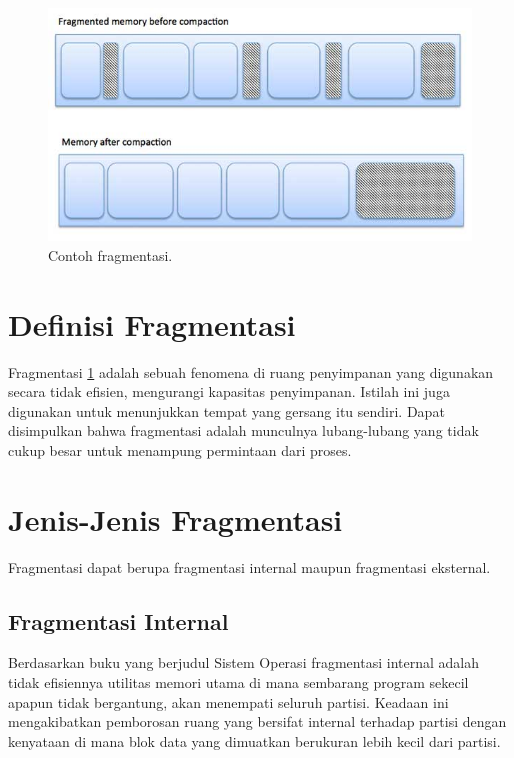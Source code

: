 ﻿%

\begin{figure}[ht]
\centerline{\includegraphics[width=1\textwidth]{figures/fragmentation.jpg}}
\caption{Contoh fragmentasi.}
\label{fragmentasi}
\end{figure}

\section{Definisi Fragmentasi}
Fragmentasi \ref{fragmentasi} adalah sebuah fenomena di ruang penyimpanan yang digunakan secara tidak efisien, mengurangi kapasitas penyimpanan. Istilah ini juga digunakan untuk menunjukkan tempat yang gersang itu sendiri. Dapat disimpulkan bahwa fragmentasi adalah munculnya lubang-lubang yang tidak cukup besar untuk menampung permintaan dari proses.

\section{Jenis-Jenis Fragmentasi}
Fragmentasi dapat berupa fragmentasi internal maupun fragmentasi eksternal.
\subsection{Fragmentasi Internal}
Berdasarkan buku yang berjudul Sistem Operasi \cite{pangera2005sistem} fragmentasi internal adalah tidak efisiennya utilitas memori utama di mana sembarang program sekecil apapun tidak bergantung, akan menempati seluruh partisi. Keadaan ini mengakibatkan pemborosan ruang yang bersifat internal terhadap partisi dengan kenyataan di mana blok data yang dimuatkan berukuran lebih kecil dari partisi.


